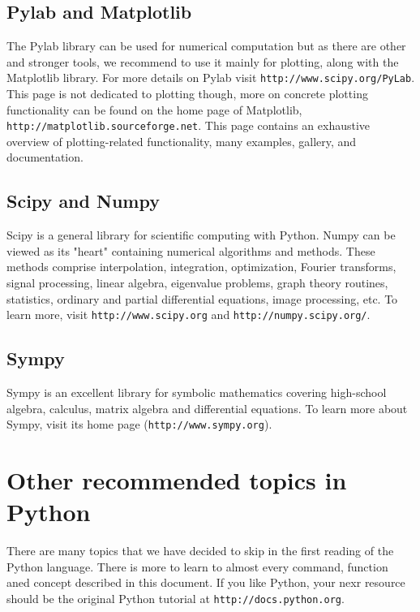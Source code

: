 \subsection{Pylab and Matplotlib}

The Pylab library can be used for numerical computation but as there are other 
and stronger tools, we recommend to use it mainly for plotting, along with the 
Matplotlib library. For more details on Pylab visit {\tt http://www.scipy.org/PyLab}.
This page is not dedicated to plotting though, more on concrete plotting functionality 
can be found on the home page of Matplotlib, {\tt http://matplotlib.sourceforge.net}.
This page contains an exhaustive overview of plotting-related functionality, many
examples, gallery, and documentation.

\subsection{Scipy and Numpy}

Scipy is a general library for scientific computing with 
Python. Numpy can be viewed as its "heart" containing numerical 
algorithms and methods. These methods comprise interpolation, 
integration, optimization, Fourier transforms, signal processing, 
linear algebra, eigenvalue problems, graph theory routines,
statistics, ordinary and partial differential equations,
image processing, etc. To learn more, visit 
{\tt http://www.scipy.org} and {\tt http://numpy.scipy.org/}. 

\subsection{Sympy}

Sympy is an excellent library for symbolic mathematics covering high-school 
algebra, calculus, matrix algebra and differential equations. To learn more
about Sympy, visit its home page ({\tt http://www.sympy.org}).

\section{Other recommended topics in Python} \label{sec:adv}

There are many topics that we have decided to skip in the first reading 
of the Python language. There is more to learn to almost every command,
function aned concept described in this document. If you like Python,
your nexr resource should be the original Python tutorial at 
{\tt http://docs.python.org}. 




